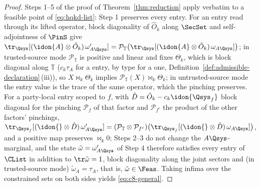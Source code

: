 \begin{proof}
Steps 1--5 of the proof of Theorem~\ref{thm:reduction} apply verbatim
to a feasible point of \eqref{eq:hqkd-list}: Step 1 preserves every
entry. For an entry read through its lifted operator, block diagonality
of $\hat O_k$ along $\SecSet$ and self-adjointness of $\PinS$ give
$\tr_{\Qsys}[(\idon{A}\otimes\hat O_k)\,\omega'_{A\Qsys}]
=\mathcal{P}_{\mathbb{T}}\big(\tr_{\Qsys}[(\idon{A}\otimes\hat O_k)\,
\omega_{A\Qsys}]\big)$; in trusted-source mode $\mathcal{P}_{\mathbb{T}}$ is
positive and linear and fixes $\Theta_k$, which is block diagonal along
$\mathbb{T}$ ($c_k\tau_A$ for a  entry, by type for
a  one, Definition~\ref{def:admissible-declaration}\,(iii)), so
$X\bowtie_k\Theta_k$ implies
$\mathcal{P}_{\mathbb{T}}(X)\bowtie_k\Theta_k$; in untrusted-source mode the
entry value is the trace of the same operator, which the pinching
preserves. For a party-local entry scoped to $f$, with
$\hat D=\hat O_k-c_k\idon{\Qsys_f}$ block diagonal for the pinching
$\mathcal{P}_f$ of that factor and $\mathcal{P}_{f^c}$ the product of the
other factors' pinchings,
$\tr_{\Qsys_f}[(\idon{}\otimes\hat D)\,\omega'_{A\Qsys}]
=(\mathcal{P}_{\mathbb{T}}\otimes\mathcal{P}_{f^c})\big(
\tr_{\Qsys_f}[(\idon{}\otimes\hat D)\,\omega_{A\Qsys}]\big)$, and a positive
map preserves $\bowtie_k0$; Steps 2--3 do not change
the $A\Qsys$-marginal, and the state
$\tilde\omega=\omega'_{A\Qsys}$ of Step 4 therefore satisfies every
entry of $\CList$ in addition to $\tr\tilde\omega=1$, block diagonality along the joint
sectors
and (in trusted-source mode) $\tilde\omega_A=\tau_A$, that is,
$\tilde\omega\in\Feas$. Taking infima over
the constrained sets on both sides yields \eqref{eq:c8-general}.
\end{proof}
